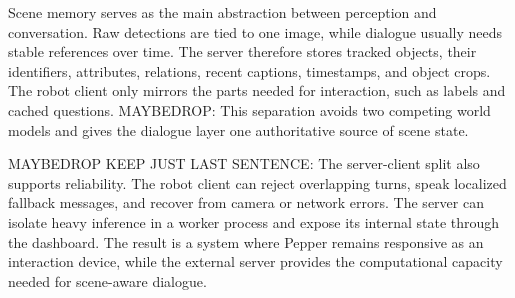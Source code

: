 Scene memory serves as the main abstraction between perception and conversation. Raw detections are tied to one image, while dialogue usually needs stable references over time. The server therefore stores tracked objects, their identifiers, attributes, relations, recent captions, timestamps, and object crops. The robot client only mirrors the parts needed for interaction, such as labels and cached questions. MAYBEDROP: This separation avoids two competing world models and gives the dialogue layer one authoritative source of scene state.

MAYBEDROP KEEP JUST LAST SENTENCE: The server-client split also supports reliability. The robot client can reject overlapping turns, speak localized fallback messages, and recover from camera or network errors. The server can isolate heavy inference in a worker process and expose its internal state through the dashboard. The result is a system where Pepper remains responsive as an interaction device, while the external server provides the computational capacity needed for scene-aware dialogue.
